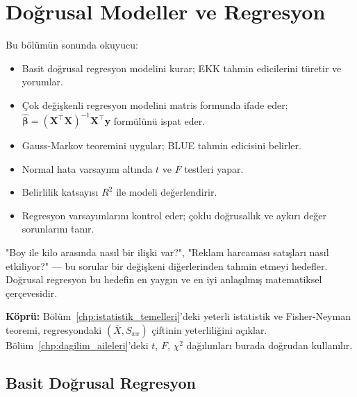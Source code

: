 \chapter{Doğrusal Modeller ve Regresyon}
\label{chp:dogrusal_modeller}


\begin{kazanimlar}
Bu bölümün sonunda okuyucu:
\begin{itemize}
  \item Basit doğrusal regresyon modelini kurar; EKK tahmin edicilerini türetir ve yorumlar.
  \item Çok değişkenli regresyon modelini matris formunda ifade eder; $\hat{\boldsymbol{\beta}} = (\mathbf{X}^\top\mathbf{X})^{-1}\mathbf{X}^\top\mathbf{y}$ formülünü ispat eder.
  \item Gauss-Markov teoremini uygular; BLUE tahmin edicisini belirler.
  \item Normal hata varsayımı altında $t$ ve $F$ testleri yapar.
  \item Belirlilik katsayısı $R^2$ ile modeli değerlendirir.
  \item Regresyon varsayımlarını kontrol eder; çoklu doğrusallık ve aykırı değer sorunlarını tanır.
\end{itemize}
\end{kazanimlar}

\begin{motivasyon}
"Boy ile kilo arasında nasıl bir ilişki var?", "Reklam harcaması satışları nasıl etkiliyor?" --- bu sorular bir değişkeni diğerlerinden tahmin etmeyi hedefler. Doğrusal regresyon bu hedefin en yaygın ve en iyi anlaşılmış matematiksel çerçevesidir.

\medskip
\noindent\textbf{Köprü:} Bölüm~\ref{chp:istatistik_temelleri}'deki yeterli istatistik ve Fisher-Neyman teoremi, regresyondaki $(\bar{X},S_{xx})$ çiftinin yeterliliğini açıklar. Bölüm~\ref{chp:dagilim_aileleri}'deki $t$, $F$, $\chi^2$ dağılımları burada doğrudan kullanılır.
\end{motivasyon}

\section{Basit Doğrusal Regresyon}
\label{sec:basit_regresyon}

